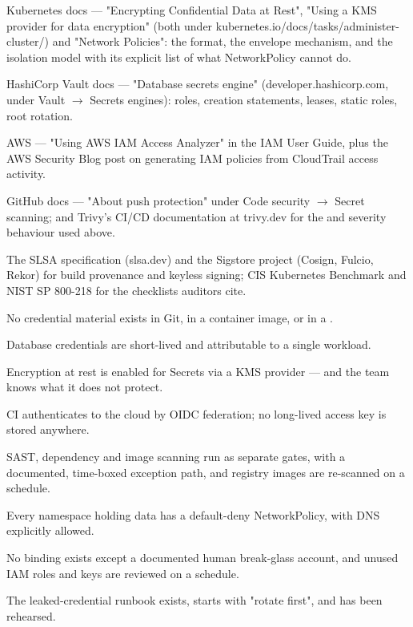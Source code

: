 \begin{wbitem}
  \item Kubernetes docs --- "Encrypting Confidential Data at Rest", "Using a KMS provider for data encryption" (both under kubernetes.io/docs/tasks/administer-cluster/) and "Network Policies": the  format, the envelope mechanism, and the isolation model with its explicit list of what NetworkPolicy cannot do.
  \item HashiCorp Vault docs --- "Database secrets engine" (developer.hashicorp.com, under Vault $\rightarrow$ Secrets engines): roles, creation statements, leases, static roles, root rotation.
  \item AWS --- "Using AWS IAM Access Analyzer" in the IAM User Guide, plus the AWS Security Blog post on generating IAM policies from CloudTrail access activity.
  \item GitHub docs --- "About push protection" under Code security $\rightarrow$ Secret scanning; and Trivy's CI/CD documentation at trivy.dev for the  and severity behaviour used above.
  \item The SLSA specification (slsa.dev) and the Sigstore project (Cosign, Fulcio, Rekor) for build provenance and keyless signing; CIS Kubernetes Benchmark and NIST SP 800-218 for the checklists auditors cite.
\end{wbitem}

\begin{checklist}
  \item No credential material exists in Git, in a container image, or in a .
  \item Database credentials are short-lived and attributable to a single workload.
  \item Encryption at rest is enabled for Secrets via a KMS provider --- and the team knows what it does not protect.
  \item CI authenticates to the cloud by OIDC federation; no long-lived access key is stored anywhere.
  \item SAST, dependency and image scanning run as separate gates, with a documented, time-boxed exception path, and registry images are re-scanned on a schedule.
  \item Every namespace holding data has a default-deny NetworkPolicy, with DNS explicitly allowed.
  \item No  binding exists except a documented human break-glass account, and unused IAM roles and keys are reviewed on a schedule.
  \item The leaked-credential runbook exists, starts with "rotate first", and has been rehearsed.
\end{checklist}

